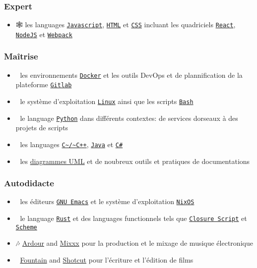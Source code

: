 \documentclass[11pt]{article}
\begin{document}
\subsubsection{Expert}
\label{sec:orgdebdeb2}
\begin{itemize}
\item 🕸 les languages \href{https://www.javascript.com/}{\texttt{Javascript}}, \href{https://html.spec.whatwg.org/multipage/}{\texttt{HTML}} et \href{https://www.w3.org/Style/CSS/}{\texttt{CSS}} incluant les quadriciels \href{https://reactjs.org/}{\texttt{React}}, \href{https://nodejs.org}{\texttt{NodeJS}} et \href{https://webpack.js.org/}{\texttt{Webpack}}
\end{itemize}

\subsubsection{Maîtrise}
\label{sec:orgaf4b33e}
\begin{itemize}
\item 🐋 les environnements \href{https://www.docker.com/}{\texttt{Docker}} et les outils DevOps et de plannification de la plateforme \href{https://about.gitlab.com/}{\texttt{Gitlab}}
\item 🐧 le système d'exploitation \href{https://kernel.org/}{\texttt{Linux}} ainsi que les scripts \href{https://www.gnu.org/software/bash/}{\texttt{Bash}}
\item 🐍 le language \href{https://www.python.org/}{\texttt{Python}} dans différents contextes: de services dorseaux à des projets de scripts
\item 🤖 les languages \href{https://en.cppreference.com/w/}{\texttt{C\textasciitilde{}/\textasciitilde{}C++}}, \href{https://www.java.com/en/}{\texttt{Java}} et \href{https://dotnet.microsoft.com/en-us/}{\texttt{C\#}}
\item 📝 les \href{https://www.uml-diagrams.org/}{diagrammes UML} et de noubreux outils et pratiques de documentations
\end{itemize}

\subsubsection{Autodidacte}
\label{sec:org218a21f}
\begin{itemize}
\item 🐄 les éditeurs \href{https://www.gnu.org/software/emacs/}{\texttt{GNU Emacs}} et le système d'exploitation \href{https://nixos.org/}{\texttt{NixOS}}
\item 🦀 le language \href{https://www.rust-lang.org/}{\texttt{Rust}} et des languages functionnels tels que \href{https://clojurescript.org/}{\texttt{Closure Script}} et \href{http://www.call-cc.org/}{\texttt{Scheme}}
\item 🎶 \href{https://ardour.org/}{Ardour} and \href{https://mixxx.org/}{Mixxx} pour la production et le mixage de musique électronique
\item 🎥 \href{https://fountain.io/}{Fountain} and \href{https://www.shotcut.org/}{Shotcut} pour l'écriture et l'édition de films
\end{itemize}
\end{document}
